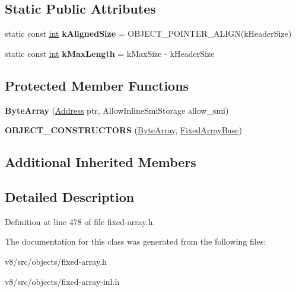 \subsection*{Static Public Attributes}
\begin{DoxyCompactItemize}
\item 
\mbox{\label{classv8_1_1internal_1_1ByteArray_a2eff4f9abade4d922dd6f82df8c24387}} 
static const \mbox{\hyperlink{classint}{int}} {\bfseries k\+Aligned\+Size} = O\+B\+J\+E\+C\+T\+\_\+\+P\+O\+I\+N\+T\+E\+R\+\_\+\+A\+L\+I\+GN(k\+Header\+Size)
\item 
\mbox{\label{classv8_1_1internal_1_1ByteArray_abb6e4506197d4155b8c9509fd49f13cb}} 
static const \mbox{\hyperlink{classint}{int}} {\bfseries k\+Max\+Length} = k\+Max\+Size -\/ k\+Header\+Size
\end{DoxyCompactItemize}
\subsection*{Protected Member Functions}
\begin{DoxyCompactItemize}
\item 
\mbox{\label{classv8_1_1internal_1_1ByteArray_a9150412cd8f7334c2ed487d0f353124f}} 
{\bfseries Byte\+Array} (\mbox{\hyperlink{classuintptr__t}{Address}} ptr, Allow\+Inline\+Smi\+Storage allow\+\_\+smi)
\item 
\mbox{\label{classv8_1_1internal_1_1ByteArray_aed8f6722ff898071d3eb18ebdc9f1a2b}} 
{\bfseries O\+B\+J\+E\+C\+T\+\_\+\+C\+O\+N\+S\+T\+R\+U\+C\+T\+O\+RS} (\mbox{\hyperlink{classv8_1_1internal_1_1ByteArray}{Byte\+Array}}, \mbox{\hyperlink{classv8_1_1internal_1_1FixedArrayBase}{Fixed\+Array\+Base}})
\end{DoxyCompactItemize}
\subsection*{Additional Inherited Members}


\subsection{Detailed Description}


Definition at line 478 of file fixed-\/array.\+h.



The documentation for this class was generated from the following files\+:\begin{DoxyCompactItemize}
\item 
v8/src/objects/fixed-\/array.\+h\item 
v8/src/objects/fixed-\/array-\/inl.\+h\end{DoxyCompactItemize}
